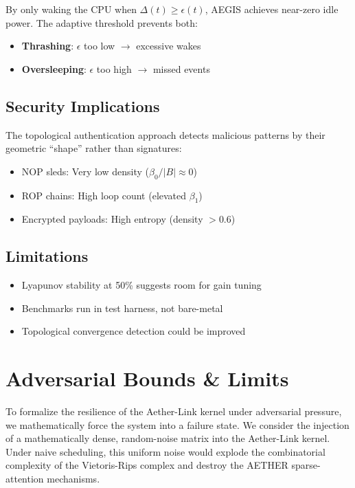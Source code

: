 \documentclass[conference]{IEEEtran}
\begin{document}
By only waking the CPU when $\Delta(t) \geq \epsilon(t)$, AEGIS achieves near-zero idle power. The adaptive threshold prevents both:
\begin{itemize}
\item \textbf{Thrashing}: $\epsilon$ too low $\rightarrow$ excessive wakes
\item \textbf{Oversleeping}: $\epsilon$ too high $\rightarrow$ missed events
\end{itemize}

\subsection{Security Implications}

The topological authentication approach detects malicious patterns by their geometric ``shape'' rather than signatures:
\begin{itemize}
\item NOP sleds: Very low density ($\beta_0/|B| \approx 0$)
\item ROP chains: High loop count (elevated $\beta_1$)
\item Encrypted payloads: High entropy (density $> 0.6$)
\end{itemize}

\subsection{Limitations}

\begin{itemize}
\item Lyapunov stability at 50\% suggests room for gain tuning
\item Benchmarks run in test harness, not bare-metal
\item Topological convergence detection could be improved
\end{itemize}

\section{Adversarial Bounds \& Limits}

To formalize the resilience of the Aether-Link kernel under adversarial pressure, we mathematically force the system into a failure state. We consider the injection of a mathematically dense, random-noise matrix into the Aether-Link kernel. Under naive scheduling, this uniform noise would explode the combinatorial complexity of the Vietoris-Rips complex and destroy the AETHER sparse-attention mechanisms.
\end{document}
